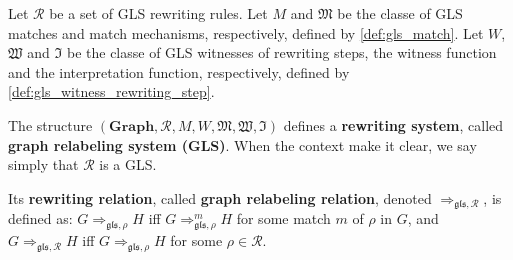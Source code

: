 
\begin{definition}
  Let $\mathcal{R}$ be a set of GLS rewriting rules. Let $M$ and $\mathfrak{M}$ be the classe of GLS matches and match mechanisms, respectively, defined by \autoref{def:gls_match}. Let $W$, $\mathfrak{W}$ and $\mathfrak{I}$
   be the classe of GLS witnesses of rewriting steps, the witness function and the interpretation function, respectively, defined by \autoref{def:gls_witness_rewriting_step}. 

  The structure $(\mathbf{Graph},\mathcal{R},M,W,\mathfrak{M},\mathfrak{W},\mathfrak{I})$ defines a \textbf{rewriting system}, called \textbf{graph relabeling system (GLS)}. When the context make it clear, we say simply that $\mathcal{R}$ is a GLS.

  Its \textbf{rewriting relation}, called \textbf{graph relabeling relation}, denoted $\Rightarrow_{\mathfrak{gls},\mathcal{R}}$, is defined as:  $G  \Rightarrow_{\mathfrak{gls}, \rho} H$ iff $G \Rightarrow^m_{\mathfrak{gls},\rho} H$ for some match $m$ of $\rho$ in $G$, and 
   $G  \Rightarrow_{\mathfrak{gls},\mathcal{R}} H$ iff $G \Rightarrow_{\mathfrak{gls},\rho} H$ for some $\rho \in \mathcal{R}$.
\end{definition}


